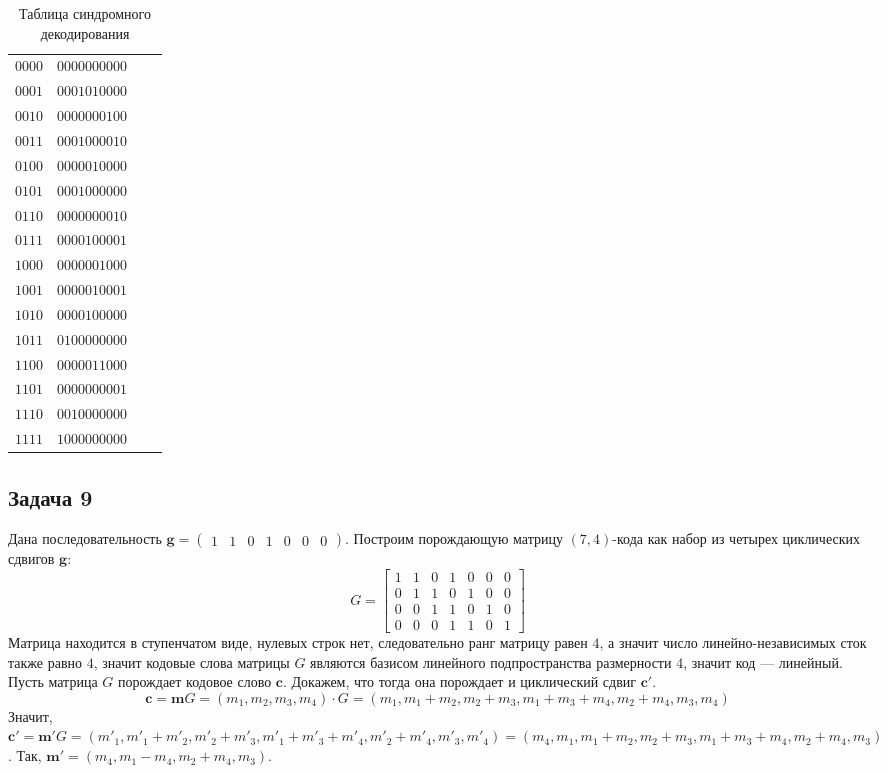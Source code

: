 \documentclass{article}
\begin{document}
\begin{table}[]
\centering
\caption{Таблица синдромного декодирования}
\begin{tabular}{|l|l|l|l|}
\hline
$0 0 0 0$ & $0 0 0 0 0 0 0 0 0 0$ \\
$0 0 0 1$ & $0 0 0 1 0 1 0 0 0 0$ \\
$0 0 1 0$ & $0 0 0 0 0 0 0 1 0 0$ \\
$0 0 1 1$ & $0 0 0 1 0 0 0 0 1 0$ \\
$0 1 0 0$ & $0 0 0 0 0 1 0 0 0 0$ \\
$0 1 0 1$ & $0 0 0 1 0 0 0 0 0 0$ \\
$0 1 1 0$ & $0 0 0 0 0 0 0 0 1 0$ \\
$0 1 1 1$ & $0 0 0 0 1 0 0 0 0 1$ \\
$1 0 0 0$ & $0 0 0 0 0 0 1 0 0 0$ \\
$1 0 0 1$ & $0 0 0 0 0 1 0 0 0 1$ \\
$1 0 1 0$ & $0 0 0 0 1 0 0 0 0 0$ \\
$1 0 1 1$ & $0 1 0 0 0 0 0 0 0 0$ \\
$1 1 0 0$ & $0 0 0 0 0 1 1 0 0 0$ \\
$1 1 0 1$ & $0 0 0 0 0 0 0 0 0 1$ \\
$1 1 1 0$ & $0 0 1 0 0 0 0 0 0 0$ \\
$1 1 1 1$ & $1 0 0 0 0 0 0 0 0 0$ \\
\hline
\end{tabular}
\end{table}
%
\subsection{Задача 9}
%
Дана последовательность $\boldsymbol{g} = \begin{pmatrix} 1 & 1 & 0 & 1 & 0 & 0 & 0 \end{pmatrix}$. Построим порождающую матрицу $(7,4)$-кода как набор из четырех циклических сдвигов $\boldsymbol{g}$:
$$G = 
    \begin{bmatrix} 
        1 & 1 & 0 & 1 & 0 & 0 & 0 \\
        0 & 1 & 1 & 0 & 1 & 0 & 0 \\
        0 & 0 & 1 & 1 & 0 & 1 & 0 \\
        0 & 0 & 0 & 1 & 1 & 0 & 1
    \end{bmatrix}
$$
Матрица находится в ступенчатом виде, нулевых строк нет, следовательно ранг матрицу равен $4$, а значит число линейно-независимых сток также равно $4$, значит кодовые слова матрицы $G$ являются базисом линейного подпространства размерности $4$, значит код {---} линейный. Пусть матрица $G$ порождает кодовое слово $\boldsymbol{c}$. Докажем, что тогда она порождает и циклический сдвиг $\boldsymbol{c'}$.
$$\boldsymbol{c} = \boldsymbol{m}G = (m_{1}, m_{2}, m_{3}, m_{4}) \cdot G = (m_{1}, m_{1} + m_{2}, m_{2} + m_{3}, m_{1} + m_{3} + m_{4}, m_{2} + m_{4}, m_{3}, m_{4})$$
Значит, $\boldsymbol{c'} = \boldsymbol{m'}G = (m'_{1}, m'_{1} + m'_{2}, m'_{2} + m'_{3}, m'_{1} + m'_{3} + m'_{4}, m'_{2} + m'_{4}, m'_{3}, m'_{4}) = (m_{4}, m_{1}, m_{1} + m_{2}, m_{2} + m_{3}, m_{1} + m_{3} + m_{4}, m_{2} + m_{4}, m_{3})$. Так, $\boldsymbol{m'} = (m_{4}, m_{1}-m_{4},m_{2}+m_{4},m_{3})$.
\end{document}

